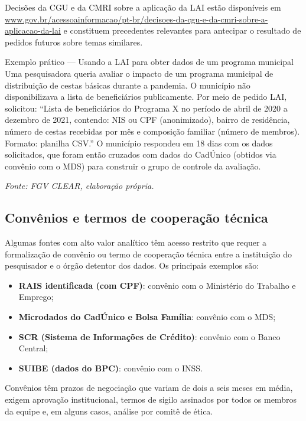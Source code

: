 Decisões da CGU e da CMRI sobre a aplicação da LAI estão disponíveis em \url{www.gov.br/acessoainformacao/pt-br/decisoes-da-cgu-e-da-cmri-sobre-a-aplicacao-da-lai} e constituem precedentes relevantes para antecipar o resultado de pedidos futuros sobre temas similares.

\begin{boxexemplo}{Exemplo prático --- Usando a LAI para obter dados de um programa municipal}
Uma pesquisadora queria avaliar o impacto de um programa municipal de distribuição de cestas básicas durante a pandemia. O município não disponibilizava a lista de beneficiários publicamente. Por meio de pedido LAI, solicitou: ``Lista de beneficiários do Programa X no período de abril de 2020 a dezembro de 2021, contendo: NIS ou CPF (anonimizado), bairro de residência, número de cestas recebidas por mês e composição familiar (número de membros). Formato: planilha CSV.'' O município respondeu em 18 dias com os dados solicitados, que foram então cruzados com dados do CadÚnico (obtidos via convênio com o MDS) para construir o grupo de controle da avaliação.

\textit{Fonte: FGV CLEAR, elaboração própria.}
\end{boxexemplo}

\subsection{Convênios e termos de cooperação técnica}

Algumas fontes com alto valor analítico têm acesso restrito que requer a formalização de convênio ou termo de cooperação técnica entre a instituição do pesquisador e o órgão detentor dos dados. Os principais exemplos são:

\begin{itemize}
  \item \textbf{RAIS identificada (com CPF)}: convênio com o Ministério do Trabalho e Emprego;
  \item \textbf{Microdados do CadÚnico e Bolsa Família}: convênio com o MDS;
  \item \textbf{SCR (Sistema de Informações de Crédito)}: convênio com o Banco Central;
  \item \textbf{SUIBE (dados do BPC)}: convênio com o INSS.
\end{itemize}

Convênios têm prazos de negociação que variam de dois a seis meses em média, exigem aprovação institucional, termos de sigilo assinados por todos os membros da equipe e, em alguns casos, análise por comitê de ética.


